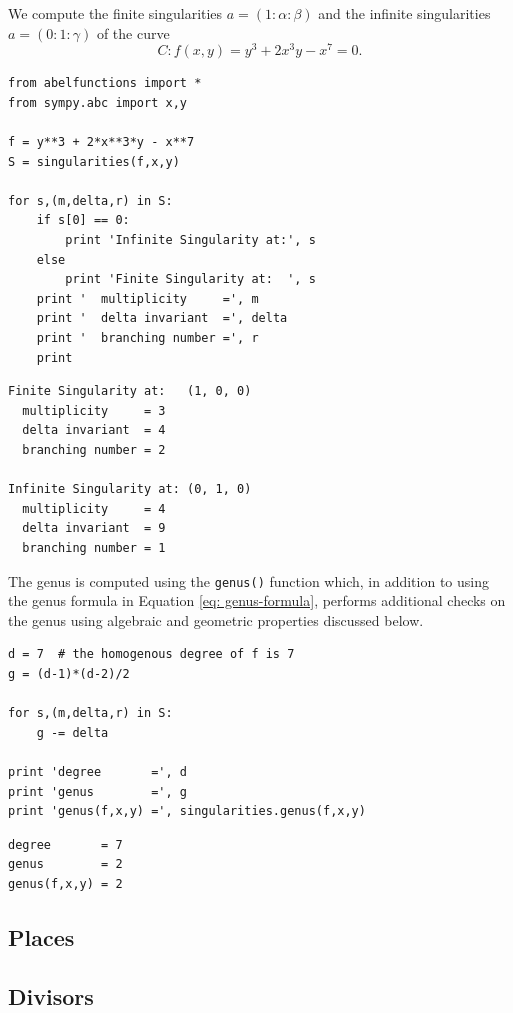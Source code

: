 We compute the finite singularities $a = (1 : \alpha : \beta)$ and the infinite
singularities $a = (0 : 1 : \gamma)$ of the curve
\[
  C : f(x,y) = y^3 + 2x^3y - x^7 = 0.
\]
\begin{lstlisting}
from abelfunctions import *
from sympy.abc import x,y

f = y**3 + 2*x**3*y - x**7
S = singularities(f,x,y)

for s,(m,delta,r) in S:
    if s[0] == 0:
        print 'Infinite Singularity at:', s
    else
        print 'Finite Singularity at:  ', s
    print '  multiplicity     =', m
    print '  delta invariant  =', delta
    print '  branching number =', r
    print
\end{lstlisting}
\begin{lstlisting}
Finite Singularity at:   (1, 0, 0)
  multiplicity     = 3
  delta invariant  = 4
  branching number = 2

Infinite Singularity at: (0, 1, 0)
  multiplicity     = 4
  delta invariant  = 9
  branching number = 1
\end{lstlisting}
The genus is computed using the {\tt genus()} function which, in addition to
using the genus formula in Equation \eqref{eq: genus-formula}, performs
additional checks on the genus using algebraic and geometric properties
discussed below.
\begin{lstlisting}[firstnumber=16]
d = 7  # the homogenous degree of f is 7
g = (d-1)*(d-2)/2

for s,(m,delta,r) in S:
    g -= delta

print 'degree       =', d
print 'genus        =', g
print 'genus(f,x,y) =', singularities.genus(f,x,y)
\end{lstlisting}
\begin{lstlisting}
degree       = 7
genus        = 2
genus(f,x,y) = 2
\end{lstlisting}


\subsection{Places}\label{subsec:background-places}

\subsection{Divisors}\label{subsec:background-divisors}

